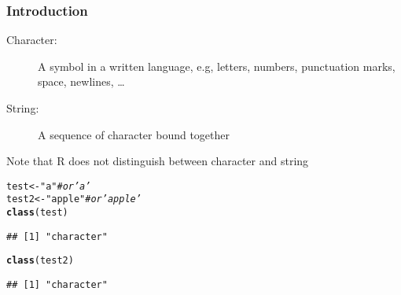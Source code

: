 \documentclass[paper=screen,mathserif]{beamer}\usepackage[]{graphicx}\usepackage[]{color}
\makeatletter
\newcommand{\hlstr}[1]{\textcolor[rgb]{0.192,0.494,0.8}{#1}}%
\newcommand{\hlcom}[1]{\textcolor[rgb]{0.678,0.584,0.686}{\textit{#1}}}%
\newcommand{\hlstd}[1]{\textcolor[rgb]{0.345,0.345,0.345}{#1}}%
\newcommand{\hlkwb}[1]{\textcolor[rgb]{0.69,0.353,0.396}{#1}}%
\newcommand{\hlkwd}[1]{\textcolor[rgb]{0.737,0.353,0.396}{\textbf{#1}}}%
\newenvironment{kframe}{%
 \def\at@end@of@kframe{}%
 \ifinner\ifhmode%
  \def\at@end@of@kframe{\end{minipage}}%
  \begin{minipage}{\columnwidth}%
 \fi\fi%
 \def\FrameCommand##1{\hskip\@totalleftmargin \hskip-\fboxsep
 \colorbox{shadecolor}{##1}\hskip-\fboxsep
     \hskip-\linewidth \hskip-\@totalleftmargin \hskip\columnwidth}%
 \MakeFramed {\advance\hsize-\width
   \@totalleftmargin\z@ \linewidth\hsize
   \@setminipage}}%
 {\par\unskip\endMakeFramed%
 \at@end@of@kframe}
\newenvironment{knitrout}{}{} %
\newcommand{\ft}[1]{\frametitle{#1}}
\newenvironment{xframe}[1][]
{\begin{frame}[fragile,environment=xframe]
    \frametitle{#1}}
  {\end{frame}}
\makeatother
\begin{document}
\begin{xframe}
  \ft{Introduction}
  
  \begin{description}
  \item[Character:] A symbol in a written language, e.g, letters,
    numbers, punctuation marks, space, newlines, \dots
  \item[String:] A sequence of character bound together
  \end{description}
  Note that R does not distinguish between character and string
\begin{knitrout}\scriptsize
{}\color{fgcolor}\begin{kframe}
\begin{alltt}
\hlstd{test} \hlkwb{<-} \hlstr{"a"} \hlcom{# or 'a'}
\hlstd{test2} \hlkwb{<-} \hlstr{"apple"} \hlcom{# or 'apple'}
\hlkwd{class}\hlstd{(test)}
\end{alltt}
\begin{verbatim}
## [1] "character"
\end{verbatim}
\begin{alltt}
\hlkwd{class}\hlstd{(test2)}
\end{alltt}
\begin{verbatim}
## [1] "character"
\end{verbatim}
\end{kframe}
\end{knitrout}

\end{xframe}
\end{document}
